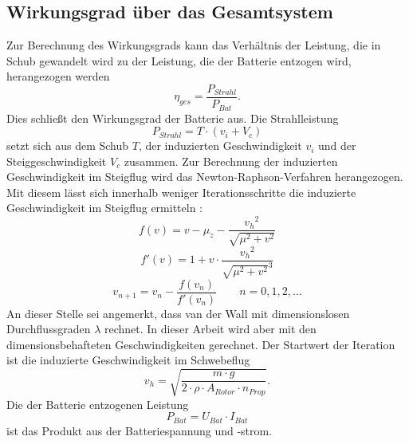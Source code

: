 \subsection{Wirkungsgrad über das Gesamtsystem}
\label{subsec:eta_ges}
Zur Berechnung des Wirkungsgrads kann das Verhältnis der Leistung, die in Schub gewandelt wird zu der Leistung, die der Batterie entzogen wird, herangezogen werden
\begin{equation}
	\eta_{ges} = \frac{P_{Strahl}}{P_{Bat}}.
\end{equation}
Dies schließt den Wirkungsgrad der Batterie aus.
Die Strahlleistung 
\begin{equation}
	P_{Strahl} = T\cdot (v_i + V_c)
\end{equation}
setzt sich aus dem Schub \ensuremath{T}, der induzierten Geschwindigkeit \ensuremath{v_i} und der Steiggeschwindigkeit \ensuremath{V_c} zusammen.
Zur Berechnung der induzierten Geschwindigkeit im Steigflug wird das Newton-Raphson-Verfahren herangezogen. Mit diesem lässt sich innerhalb weniger Iterationsschritte die induzierte Geschwindigkeit im Steigflug ermitteln \cite[S.153]{Wall.2015}:
\begin{equation}
	f(v) = v-\mu_z-\frac{{v_h}^2}{\sqrt{\mu^2+v^2}}
\end{equation}
\begin{equation}
	f'(v) = 1 + v\cdot\frac{{v_h}^2}{\sqrt{\mu^2+v^2}^3}
\end{equation}
\begin{equation}
	v_{n+1} = v_n - \frac{f(v_n)}{f'(v_n)}\qquad n = 0,1,2,\dots
\end{equation}
An dieser Stelle sei angemerkt, dass van der Wall mit dimensionslosen Durchflussgraden \ensuremath{\lambda} rechnet. In dieser Arbeit wird aber mit den dimensionsbehafteten Geschwindigkeiten gerechnet.
Der Startwert der Iteration ist die induzierte Geschwindigkeit im Schwebeflug
\begin{equation}
	v_h = \sqrt{\frac{m\cdot g}{2\cdot\rho\cdot A_{Rotor}\cdot n_{Prop}}}.
\end{equation}
Die der Batterie entzogenen Leistung
\begin{equation}
	P_{Bat} = U_{Bat}\cdot I_{Bat}
\end{equation}
ist das Produkt aus der Batteriespannung und -strom.


